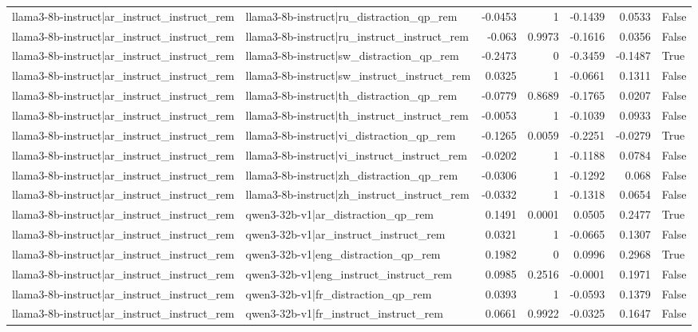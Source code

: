 \begin{table}
\begin{tabular}{l l r r r r l}
llama3-8b-instruct|ar_instruct_instruct_rem & llama3-8b-instruct|ru_distraction_qp_rem & -0.0453 & 1 & -0.1439 & 0.0533 & False \\
llama3-8b-instruct|ar_instruct_instruct_rem & llama3-8b-instruct|ru_instruct_instruct_rem & -0.063 & 0.9973 & -0.1616 & 0.0356 & False \\
llama3-8b-instruct|ar_instruct_instruct_rem & llama3-8b-instruct|sw_distraction_qp_rem & -0.2473 & 0 & -0.3459 & -0.1487 & True \\
llama3-8b-instruct|ar_instruct_instruct_rem & llama3-8b-instruct|sw_instruct_instruct_rem & 0.0325 & 1 & -0.0661 & 0.1311 & False \\
llama3-8b-instruct|ar_instruct_instruct_rem & llama3-8b-instruct|th_distraction_qp_rem & -0.0779 & 0.8689 & -0.1765 & 0.0207 & False \\
llama3-8b-instruct|ar_instruct_instruct_rem & llama3-8b-instruct|th_instruct_instruct_rem & -0.0053 & 1 & -0.1039 & 0.0933 & False \\
llama3-8b-instruct|ar_instruct_instruct_rem & llama3-8b-instruct|vi_distraction_qp_rem & -0.1265 & 0.0059 & -0.2251 & -0.0279 & True \\
llama3-8b-instruct|ar_instruct_instruct_rem & llama3-8b-instruct|vi_instruct_instruct_rem & -0.0202 & 1 & -0.1188 & 0.0784 & False \\
llama3-8b-instruct|ar_instruct_instruct_rem & llama3-8b-instruct|zh_distraction_qp_rem & -0.0306 & 1 & -0.1292 & 0.068 & False \\
llama3-8b-instruct|ar_instruct_instruct_rem & llama3-8b-instruct|zh_instruct_instruct_rem & -0.0332 & 1 & -0.1318 & 0.0654 & False \\
llama3-8b-instruct|ar_instruct_instruct_rem & qwen3-32b-v1|ar_distraction_qp_rem & 0.1491 & 0.0001 & 0.0505 & 0.2477 & True \\
llama3-8b-instruct|ar_instruct_instruct_rem & qwen3-32b-v1|ar_instruct_instruct_rem & 0.0321 & 1 & -0.0665 & 0.1307 & False \\
llama3-8b-instruct|ar_instruct_instruct_rem & qwen3-32b-v1|eng_distraction_qp_rem & 0.1982 & 0 & 0.0996 & 0.2968 & True \\
llama3-8b-instruct|ar_instruct_instruct_rem & qwen3-32b-v1|eng_instruct_instruct_rem & 0.0985 & 0.2516 & -0.0001 & 0.1971 & False \\
llama3-8b-instruct|ar_instruct_instruct_rem & qwen3-32b-v1|fr_distraction_qp_rem & 0.0393 & 1 & -0.0593 & 0.1379 & False \\
llama3-8b-instruct|ar_instruct_instruct_rem & qwen3-32b-v1|fr_instruct_instruct_rem & 0.0661 & 0.9922 & -0.0325 & 0.1647 & False \\

\end{tabular}
\end{table}
